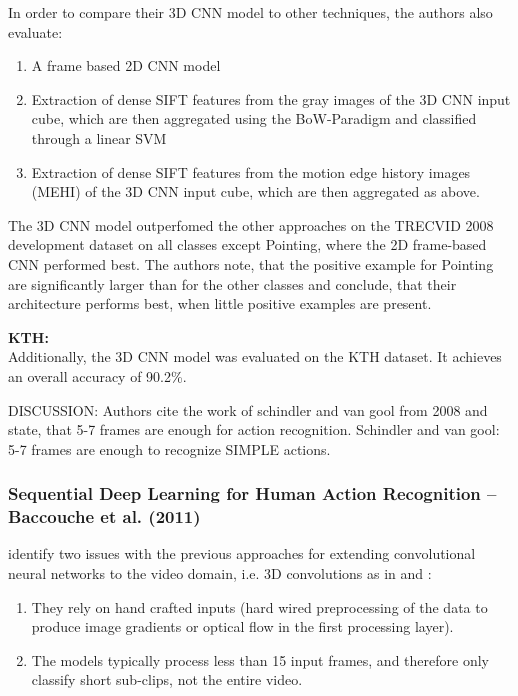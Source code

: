 In order to compare their 3D CNN model to other techniques, the authors also evaluate:
\begin{enumerate}
    \item A frame based 2D CNN model
    \item Extraction of dense SIFT features from the gray images of the 3D CNN input cube, which are then aggregated using the BoW-Paradigm and classified through a linear SVM
    \item Extraction of dense SIFT features from the motion edge history images (MEHI) of the 3D CNN input cube, which are then aggregated as above.
\end{enumerate}

The 3D CNN model outperfomed the other approaches on the TRECVID 2008 development dataset on all classes except Pointing, where the 2D frame-based CNN performed best.
The authors note, that the positive example for Pointing are significantly larger than for the other classes and conclude, that their architecture performs best, when little positive examples are present.

\textbf{KTH:}\\
Additionally, the 3D CNN model was evaluated on the KTH dataset.
It achieves an overall accuracy of 90.2\%.

DISCUSSION: Authors cite the work of schindler and van gool from 2008 and state, that 5-7 frames are enough for action recognition.
Schindler and van gool: 5-7 frames are enough to recognize SIMPLE actions.

\subsubsection{Sequential Deep Learning for Human Action Recognition -- Baccouche et al. (2011)}
\textcite{baccouche_sequential_2011} identify two issues with the previous approaches for extending convolutional neural networks to the video domain, i.e. 3D convolutions as in \cite{ji_3d_2013} and \cite{kim_human_2007}:

\begin{enumerate}
    \item They rely on hand crafted inputs (hard wired preprocessing of the data to produce image gradients or optical flow in the first processing layer).
    \item The models typically process less than 15 input frames, and therefore only classify short sub-clips, not the entire video.
\end{enumerate}

